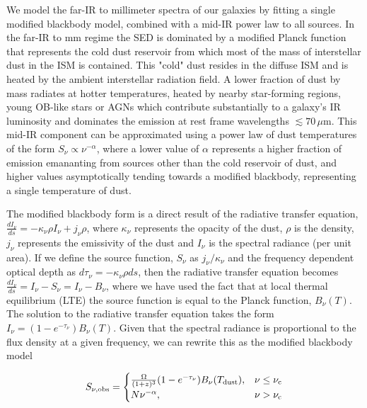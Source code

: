 We model the far-IR to millimeter spectra of our galaxies by fitting a single modified blackbody model, combined with a mid-IR power law to all sources. In the far-IR to mm regime the SED is dominated by a modified Planck function that represents the cold dust reservoir from which most of the mass of interstellar dust in the ISM is contained. This "cold" dust resides in the diffuse ISM and is heated by the ambient interstellar radiation field. A lower fraction of dust by mass radiates at hotter temperatures, heated by nearby star-forming regions, young OB-like stars or AGNs which contribute substantially to a galaxy's IR luminosity and dominates the emission at rest frame wavelengths $\lesssim 70\,\mu$m. This mid-IR component can be approximated using a power law of dust temperatures of the form $S_\nu \propto \nu^{-\alpha}$, where a lower value of $\alpha$ represents a higher fraction of emission emananting from sources other than the cold reservoir of dust, and higher values asymptotically tending towards a modified blackbody, representing a single temperature of dust.

The modified blackbody form is a direct result of the radiative transfer equation, $\frac{dI_\nu}{ds} = -\kappa_\nu \rho I_\nu + j_\nu \rho$, where $\kappa_\nu$ represents the opacity of the dust, $\rho$ is the density, $j_\nu$ represents the emissivity of the dust and $I_\nu$ is the spectral radiance (per unit area). If we define the source function, $S_\nu$ as $j_\nu/\kappa_\nu$ and the frequency dependent optical depth as $d\tau_\nu = -\kappa_\nu \rho ds$, then the radiative transfer equation becomes $\frac{dI_\nu}{ds} = I_\nu - S_\nu = I_\nu - B_\nu$, where we have used the fact that at local thermal equilibrium (LTE) the source function is equal to the Planck function, $B_\nu(T)$. The solution to the radiative transfer equation takes the form $I_\nu = (1 - e^{-\tau_\nu}) B_\nu(T)$. Given that the spectral radiance is proportional to the flux density at a given frequency, we can rewrite this as the modified blackbody model

\begin{equation}
	S_{\nu, \textrm{obs}} =  
	\begin{cases}
	 	\frac{\Omega}{(1+z)^3} (1- e^{-\tau_\nu}) B_\nu(T_{\textrm{dust}}), & \nu \le \nu_{\rm c} \\
	 	 N \nu^{-\alpha}, & \nu > \nu_{\rm c} \\
	\end{cases}
	\label{eq:modified_blackbody_omega}
\end{equation}

